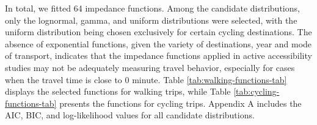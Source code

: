 \documentclass[preprint, 3p,
authoryear]{elsarticle} %
\begin{document}
In total, we fitted 64 impedance functions. Among the candidate
distributions, only the lognormal, gamma, and uniform distributions were
selected, with the uniform distribution being chosen exclusively for
certain cycling destinations. The absence of exponential functions,
given the variety of destinations, year and mode of transport, indicates
that the impedance functions applied in active accessibility studies may
not be adequately measuring travel behavior, especially for cases when
the travel time is close to 0 minute. Table
\ref{tab:walking-functions-tab} displays the selected functions for
walking trips, while Table \ref{tab:cycling-functions-tab} presents the
functions for cycling trips. Appendix A includes the AIC, BIC, and
log-likelihood values for all candidate distributions.

\begin{table}
\centering
\caption{\label{tab:selected_functions}\label{tab:walking-functions-tab}Impedance functions and AIC for walking trips.}
\centering
{}
\end{table}
\end{document}
